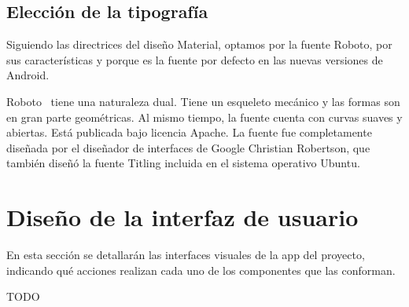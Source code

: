 \subsection{Elección de la tipografía}

Siguiendo las directrices del diseño Material, optamos por la fuente Roboto,
por sus características y porque es la fuente por defecto en las nuevas versiones
de Android.

Roboto~\cite{roboto-font} tiene una naturaleza dual. Tiene un esqueleto mecánico y
las formas son en gran parte geométricas. Al mismo tiempo, la fuente cuenta con
curvas suaves y abiertas. Está publicada bajo licencia Apache. La fuente fue
completamente diseñada por el diseñador de interfaces de Google Christian
Robertson, que también diseñó la fuente Titling incluida en el sistema operativo
Ubuntu. 


\section{Diseño de la interfaz de usuario}

En esta sección se detallarán las interfaces visuales de la app del proyecto,
indicando qué acciones realizan cada uno de los componentes que las conforman.

TODO
